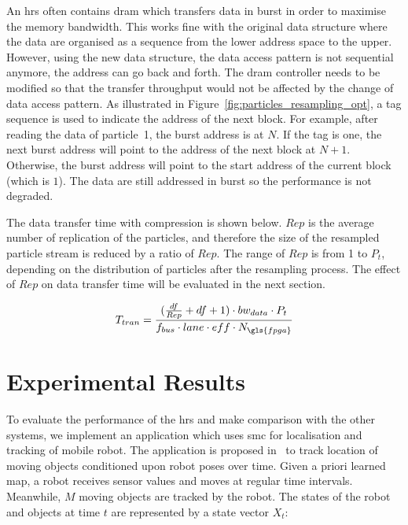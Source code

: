 An \gls{hrs} often contains \gls{dram} which transfers data in burst in order to maximise the memory bandwidth.
This works fine with the original data structure where the data are organised as a sequence from the lower address space to the upper.
However, using the new data structure, the data access pattern is not sequential anymore, the address can go back and forth.
The \gls{dram} controller needs to be modified so that the transfer throughput would not be affected by the change of data access pattern.
As illustrated in Figure~\ref{fig:particles_resampling_opt}, a tag sequence is used to indicate the address of the next block.
For example, after reading the data of particle~1, the burst address is at $N$.
If the tag is one, the next burst address will point to the address of the next block at $N+1$.
Otherwise, the burst address will point to the start address of the current block (which is $1$).
The data are still addressed in burst so the performance is not degraded.

The data transfer time with compression is shown below. 
$Rep$ is the average number of replication of the particles,
and therefore the size of the resampled particle stream is reduced by a ratio of $Rep$.
The range of $Rep$ is from 1 to $P_t$, depending on the distribution of particles after the resampling process.
The effect of $Rep$ on data transfer time will be evaluated in the next section.

\begin{equation}
\begin{aligned}
T_{tran} = \frac{(\frac{df}{Rep} + df + 1) \cdot bw_{data} \cdot P_t}{f_{bus} \cdot lane \cdot eff \cdot N_{\gls{fpga}}}
\end{aligned}
\label{eqt:data_opt}
\end{equation}

\section{Experimental Results}
\label{sec:reconfig_results}

To evaluate the performance of the \gls{hrs} and make comparison with the other systems, 
we implement an application which uses \gls{smc} for localisation and tracking of mobile robot.
The application is proposed in~\cite{montemerlo02} to track location of moving objects conditioned upon robot poses over time.
Given a priori learned map, a robot receives sensor values and moves at regular time intervals. 
Meanwhile, $M$ moving objects are tracked by the robot.
The states of the robot and objects at time $t$ are represented by a state vector $X_t$:
 
